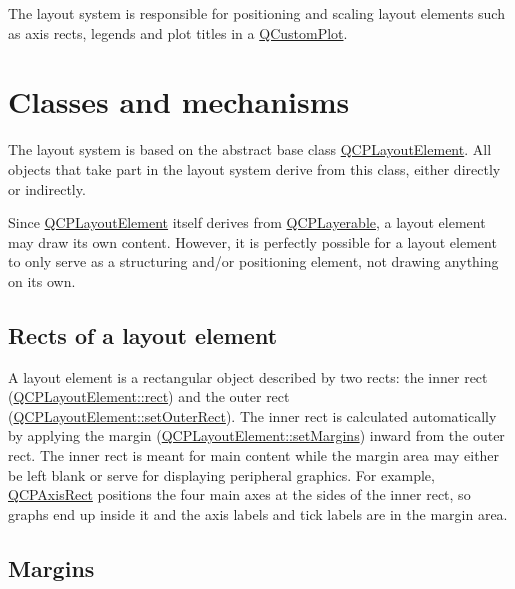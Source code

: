 The layout system is responsible for positioning and scaling layout elements such as axis rects, legends and plot titles in a \hyperlink{class_q_custom_plot}{Q\-Custom\-Plot}.\hypertarget{thelayoutsystem_layoutsystem-classesandmechanisms}{}\section{Classes and mechanisms}\label{thelayoutsystem_layoutsystem-classesandmechanisms}
The layout system is based on the abstract base class \hyperlink{class_q_c_p_layout_element}{Q\-C\-P\-Layout\-Element}. All objects that take part in the layout system derive from this class, either directly or indirectly.

Since \hyperlink{class_q_c_p_layout_element}{Q\-C\-P\-Layout\-Element} itself derives from \hyperlink{class_q_c_p_layerable}{Q\-C\-P\-Layerable}, a layout element may draw its own content. However, it is perfectly possible for a layout element to only serve as a structuring and/or positioning element, not drawing anything on its own.\hypertarget{thelayoutsystem_layoutsystem-rects}{}\subsection{Rects of a layout element}\label{thelayoutsystem_layoutsystem-rects}
A layout element is a rectangular object described by two rects\-: the inner rect (\hyperlink{class_q_c_p_layout_element_affdfea003469aac3d0fac5f4e06171bc}{Q\-C\-P\-Layout\-Element\-::rect}) and the outer rect (\hyperlink{class_q_c_p_layout_element_a38975ea13e36de8e53391ce41d94bc0f}{Q\-C\-P\-Layout\-Element\-::set\-Outer\-Rect}). The inner rect is calculated automatically by applying the margin (\hyperlink{class_q_c_p_layout_element_a8f450b1f3f992ad576fce2c63d8b79cf}{Q\-C\-P\-Layout\-Element\-::set\-Margins}) inward from the outer rect. The inner rect is meant for main content while the margin area may either be left blank or serve for displaying peripheral graphics. For example, \hyperlink{class_q_c_p_axis_rect}{Q\-C\-P\-Axis\-Rect} positions the four main axes at the sides of the inner rect, so graphs end up inside it and the axis labels and tick labels are in the margin area.\hypertarget{thelayoutsystem_layoutsystem-margins}{}\subsection{Margins}\label{thelayoutsystem_layoutsystem-margins}
